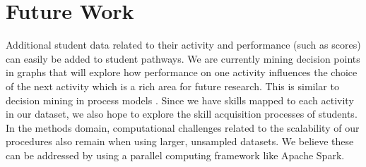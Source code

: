 \documentclass{edm_template}
\begin{document}
\section{Future Work}
Additional student data related to their activity and performance (such as scores) can easily be added to student pathways. We are currently mining decision points in graphs that will explore how performance on one activity influences the choice of the next activity which is a rich area for future research. This is similar to decision mining in process models \cite{van2016process}. Since we have skills mapped to each activity in our dataset, we also hope to explore the skill acquisition processes of students. In the methods domain, computational challenges related to the scalability of our procedures also remain when using larger, unsampled datasets. We believe these can be addressed by using a parallel computing framework like Apache Spark.



\end{document}
